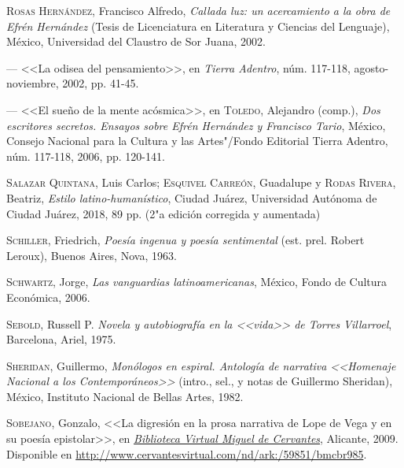 \documentclass[14pt,twoside,final]{extbook} %
\begin{document}
\textsc{Rosas Hernández}, Francisco Alfredo, \emph{Callada luz: un acercamiento a la obra de Efrén Hernández} (Tesis de Licenciatura en Literatura y Ciencias del Lenguaje), México, Universidad del Claustro de Sor Juana, 2002.\label{bib:rosas2002a}

--- <<La odisea del pensamiento>>, en \emph{Tierra Adentro}, núm. 117-118, \newline agosto-noviembre, 2002, pp. 41-45.\label{bib:rosas2002b}

--- <<El sueño de la mente acósmica>>, en \textsc{Toledo}, Alejandro (comp.), \emph{Dos escritores secretos. Ensayos sobre Efrén Hernández y Francisco Tario}, México, Consejo Nacional para la Cultura y las Artes"/Fondo Editorial Tierra Adentro, núm. 117-118, 2006, pp. 120-141.\label{bib:rosas2006}

\textsc{Salazar Quintana}, Luis Carlos; \textsc{Esquivel Carreón}, Guadalupe y \textsc{Rodas Rivera}, Beatriz, \emph{Estilo latino-humanístico}, Ciudad Juárez, Universidad Autónoma de Ciudad Juárez, 2018, 89 pp. (2"a edición corregida y aumentada)

\textsc{Schiller}, Friedrich, \emph{Poesía ingenua y poesía sentimental} (est. prel. Robert Leroux), Buenos Aires, Nova, 1963.\label{bib:schiller1963}

\textsc{Schwartz}, Jorge, \emph{Las vanguardias latinoamericanas}, México, Fondo de Cultura Económica, 2006.\label{bib:schwartz2006}

\textsc{Sebold}, Russell P. \emph{Novela y autobiografía en la <<vida>> de Torres Villarroel}, Barcelona, Ariel, 1975.\label{bib:sebold1975}

\textsc{Sheridan}, Guillermo, \emph{Monólogos en espiral. Antología de narrativa <<Homenaje Nacional a los \emph{Contemporáneos}>>} (intro., sel., y notas de Guillermo Sheridan), México, Instituto Nacional de Bellas Artes, 1982.\label{bib:sheridan1982}

\textsc{Sobejano}, Gonzalo, <<La digresión en la prosa narrativa de Lope de Vega y en su poesía epistolar>>, en \href{http://www.cervantesvirtual.com/}{\emph{Biblioteca Virtual Miguel de Cervantes}}, Alicante, 2009. Disponible en \guilsinglleft \url{http://www.cervantesvirtual.com/nd/ark:/59851/bmcbr985}\guilsinglright.
\end{document}
